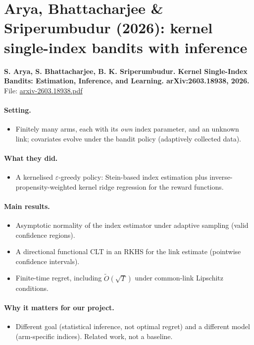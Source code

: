 \documentclass[11pt]{article}
\newcommand{\file}[1]{\url{#1}}
\begin{document}
\section{Arya, Bhattacharjee \& Sriperumbudur (2026): kernel single-index bandits with inference}
\textbf{S. Arya, S. Bhattacharjee, B. K. Sriperumbudur. Kernel Single-Index Bandits: Estimation, Inference, and Learning. arXiv:2603.18938, 2026.}\\ File: \file{arxiv-2603.18938.pdf}
\paragraph{Setting.}
\begin{itemize}\item Finitely many arms, each with its \emph{own} index parameter, and an unknown link; covariates evolve under the bandit policy (adaptively collected data).\end{itemize}
\paragraph{What they did.}
\begin{itemize}\item A kernelised $\varepsilon$-greedy policy: Stein-based index estimation plus inverse-propensity-weighted kernel ridge regression for the reward functions.\end{itemize}
\paragraph{Main results.}
\begin{itemize}\item Asymptotic normality of the index estimator under adaptive sampling (valid confidence regions).\item A directional functional CLT in an RKHS for the link estimate (pointwise confidence intervals).\item Finite-time regret, including $\tilde O(\sqrt T)$ under common-link Lipschitz conditions.\end{itemize}
\paragraph{Why it matters for our project.}
\begin{itemize}\item Different goal (statistical inference, not optimal regret) and a different model (arm-specific indices). Related work, not a baseline.\end{itemize}
\end{document}
